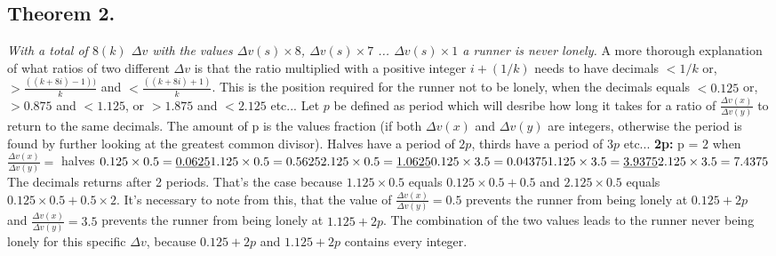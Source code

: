\documentclass[12pt, a4paper]{article}
\begin{document}
\subsection*{Theorem 2.}\textit{With a total of $8 (k)$ $\Delta v$ with the values $\Delta v(s)\times8$, $\Delta v(s)\times7$ ... $\Delta v(s)\times1$ a runner is never lonely.}
\newline
\newline
A more thorough explanation of what ratios of two different $\Delta v$ is that the ratio multiplied with a positive integer $i+(1/k)$ needs to have decimals $< 1/k$ or, $> \frac{((k+8i)-1))}{k}$ and $< \frac{((k+8i)+1)}{k}$. This is the position required for the runner not to be lonely, when the decimals equals $< 0.125$ or, $> 0.875$ and $< 1.125$, or $> 1.875$ and $< 2.125$ etc...
\newline
\newline
Let $p$ be defined as period which will desribe how long it takes for a ratio of $\frac{\Delta v(x)}{\Delta v(y)}$ to return to the same decimals. The amount of p is the values fraction (if both $\Delta v(x)$ and $\Delta v(y)$ are integers, otherwise the period is found by further looking at the greatest common divisor). Halves have a period of $2p$, thirds have a period of $3p$ etc...
\newline
\newline
\textbf{2p:}
p = $2$ when $\frac{\Delta v(x)}{\Delta v(y)} =$ halves
\newline
\newline
$0.125\times0.5 = \underline{0.0625} \newline 1.125\times0.5 = 0.5625 \newline 2.125\times0.5 = \underline{1.0625} \newline \newline 0.125\times3.5 = 0.04375 \newline 1.125\times3.5 = \underline{3.9375} \newline 2.125\times3.5 = 7.4375$
\newline
\newline
The decimals returns after 2 periods. That's the case because $1.125\times0.5$ equals $0.125\times0.5+0.5$ and $2.125\times0.5$ equals $0.125\times0.5+0.5\times2$.
\newline
It's necessary to note from this, that the value of $\frac{\Delta v(x)}{\Delta v(y)} = 0.5$ prevents the runner from being lonely at $0.125+2p$ and $\frac{\Delta v(x)}{\Delta v(y)} = 3.5$ prevents the runner from being lonely at $1.125+2p$. The combination of the two values leads to the runner never being lonely for this specific $\Delta v$, because $0.125+2p$ and $1.125+2p$ contains every integer.
\end{document}
